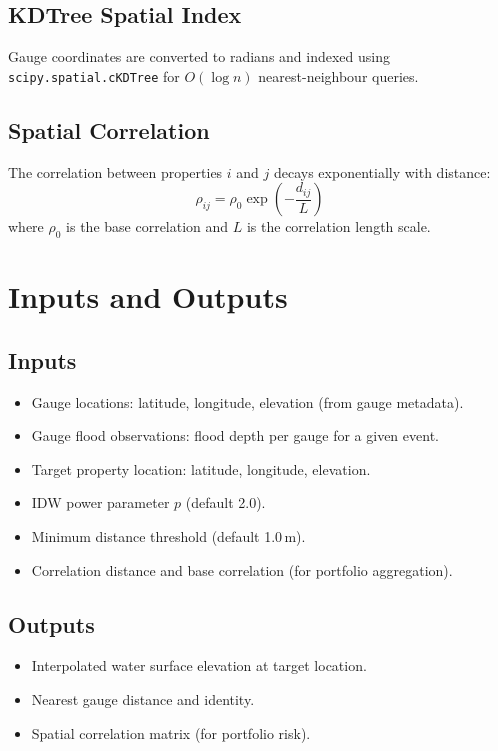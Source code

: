 \documentclass[11pt,a4paper]{article}
\begin{document}
\subsection{KDTree Spatial Index}

Gauge coordinates are converted to radians and indexed using
\texttt{scipy.spatial.cKDTree} for $O(\log n)$ nearest-neighbour queries.

\subsection{Spatial Correlation}

The correlation between properties $i$ and $j$ decays exponentially with distance:
\begin{equation}
    \rho_{ij} = \rho_0 \exp\!\left(-\frac{d_{ij}}{L}\right)
\end{equation}
where $\rho_0$ is the base correlation and $L$ is the correlation length scale.


\section{Inputs and Outputs}

\subsection{Inputs}
\begin{itemize}[nosep]
    \item Gauge locations: latitude, longitude, elevation (from gauge metadata).
    \item Gauge flood observations: flood depth per gauge for a given event.
    \item Target property location: latitude, longitude, elevation.
    \item IDW power parameter $p$ (default 2.0).
    \item Minimum distance threshold (default 1.0\,m).
    \item Correlation distance and base correlation (for portfolio aggregation).
\end{itemize}

\subsection{Outputs}
\begin{itemize}[nosep]
    \item Interpolated water surface elevation at target location.
    \item Nearest gauge distance and identity.
    \item Spatial correlation matrix (for portfolio risk).
\end{itemize}
\end{document}
